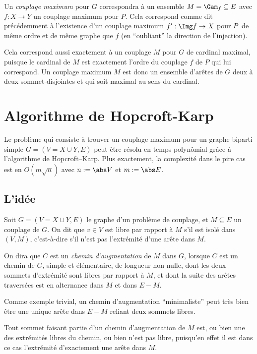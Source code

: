  Un \emph{couplage maximum} pour $G$ correspondra à un ensemble $M = \Gam_f \subseteq E$ avec $f :X \to Y$ un couplage maximum pour $P$. Cela correspond comme dit précédemment à l'existence d'un couplage maximum $f' : \Img f \to  X $ pour $P\-$ de même ordre et de même graphe que $f$ (en ``oubliant'' la direction de l'injection).
 
 Cela correspond aussi exactement à un couplage $M$ pour $G$ de cardinal maximal, puisque le cardinal de $M$ est exactement l'ordre du couplage $f$ de $P$ qui lui correspond. Un couplage maximum $M$ est donc un ensemble d'arêtes de $G$ deux à deux sommet-disjointes et qui soit maximal au sens du cardinal.
 \SEP
 
 \section{Algorithme de Hopcroft-Karp}
 
 Le problème qui consiste à trouver un couplage maximum pour un graphe biparti simple $G = (V = X \cup Y,E)$ peut être résolu en temps polynômial grâce à l'algorithme de Hopcroft–Karp. Plus exactement, la complexité dans le pire cas est en $O(m \sqrt n)$ avec $n := \abs V$ et $m := \abs E$.
 
 \subsection{L'idée}
 
 \SEP\jdefi Soit $G = (V = X \cup Y, E)$ le graphe d'un problème de couplage, et $M \subseteq E$ un couplage de $G$. On dit que $v \in V$ est libre par rapport à $M$ s'il est isolé dans $(V,M)$, c'est-à-dire s'il n'est pas l'extrémité d'une arête dans $M$.
 
 On dira que $C$ est un \emph{chemin d'augmentation} de $M$ dans $G$, lorsque $C$ est un chemin de $G$, simple et élémentaire, de longueur non nulle, dont les deux sommets d'extrémité sont libres par rapport à $M$, et dont la suite des arêtes traversées est en alternance dans $M$ et dans $E \minus M$.
 \SEP
 
 Comme exemple trivial, un chemin d'augmentation ``minimaliste'' peut très bien être une unique arête dans $E\minus M$ reliant deux sommets libres.
 
 Tout sommet faisant partie d'un chemin d'augmentation de $M$ est, ou bien une des extrémités libres du chemin, ou bien n'est pas libre, puisqu'en effet il est dans ce cas l'extrémité d'exactement une arête dans $M$.
 
